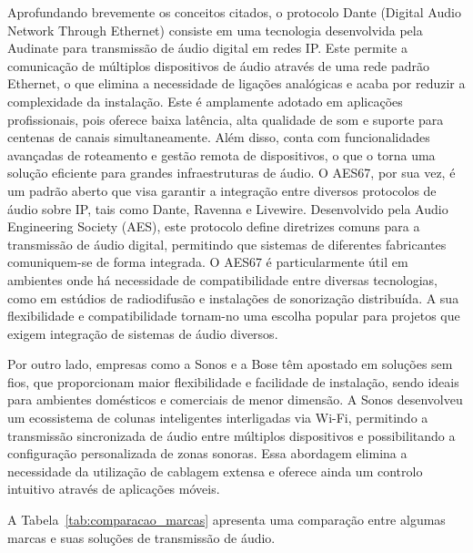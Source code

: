 \documentclass{article}
\begin{document}
Aprofundando brevemente os conceitos citados, o protocolo Dante (Digital Audio Network Through Ethernet) consiste em uma tecnologia desenvolvida pela Audinate para transmissão de áudio digital em redes IP. Este permite a comunicação de múltiplos dispositivos de áudio através de uma rede padrão Ethernet, o que elimina a necessidade de ligações analógicas e acaba por reduzir a complexidade da instalação. Este é amplamente adotado em aplicações profissionais, pois oferece baixa latência, alta qualidade de som e suporte para centenas de canais simultaneamente. Além disso, conta com funcionalidades avançadas de roteamento e gestão remota de dispositivos, o que o torna uma solução eficiente para grandes infraestruturas de áudio. O AES67, por sua vez, é um padrão aberto que visa garantir a integração entre diversos protocolos de áudio sobre IP, tais como Dante, Ravenna e Livewire. Desenvolvido pela Audio Engineering Society (AES), este protocolo define diretrizes comuns para a transmissão de áudio digital, permitindo que sistemas de diferentes fabricantes comuniquem-se de forma integrada. O AES67 é particularmente útil em ambientes onde há necessidade de compatibilidade entre diversas tecnologias, como em estúdios de radiodifusão e instalações de sonorização distribuída. A sua flexibilidade e compatibilidade tornam-no uma escolha popular para projetos que exigem integração de sistemas de áudio diversos.

Por outro lado, empresas como a Sonos e a Bose têm apostado em soluções sem fios, que proporcionam maior flexibilidade e facilidade de instalação, sendo ideais para ambientes domésticos e comerciais de menor dimensão. A Sonos desenvolveu um ecossistema de colunas inteligentes interligadas via Wi-Fi, permitindo a transmissão sincronizada de áudio entre múltiplos dispositivos e possibilitando a configuração personalizada de zonas sonoras. Essa abordagem elimina a necessidade da utilização de cablagem extensa e oferece ainda um controlo intuitivo através de aplicações móveis.

A Tabela~\ref{tab:comparacao_marcas} apresenta uma comparação entre algumas marcas e suas soluções de transmissão de áudio.
\end{document}
